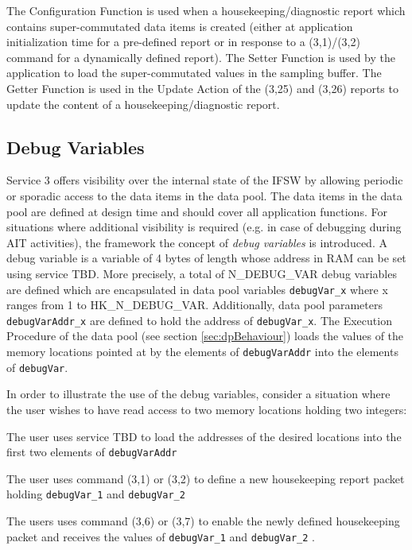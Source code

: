\documentclass{pnp_article}
\begin{document}
The Configuration Function is used when a housekeeping/diagnostic report which contains super-commutated data items is created (either at application initialization time for a pre-defined report or in response to a (3,1)/(3,2) command for a dynamically defined report). The Setter Function is used by the application to load the super-commutated values in the sampling buffer. The Getter Function is used in the Update Action of the (3,25) and (3,26) reports to update the content of a housekeeping/diagnostic report. 

\subsection{Debug Variables}\label{sec:debugVar}
Service 3 offers visibility over the internal state of the IFSW by allowing periodic or sporadic access to the data items in the data pool. The data items in the data pool are defined at design time and should cover all application functions. For situations where additional visibility is required (e.g. in case of debugging during AIT activities), the framework the concept of \textit{debug variables} is introduced. A debug variable is a variable of 4 bytes of length whose address in RAM can be set using service TBD. More precisely, a total of N\_DEBUG\_VAR debug variables are defined which are encapsulated in data pool variables \texttt{debugVar\_x} where x ranges from 1 to HK\_N\_DEBUG\_VAR. Additionally, data pool parameters \texttt{debugVarAddr\_x} are defined to hold the address of \texttt{debugVar\_x}. The Execution Procedure of the data pool (see section \ref{sec:dpBehaviour}) loads the values of the memory locations pointed at by the elements of \texttt{debugVarAddr} into the elements of \texttt{debugVar}.  

In order to illustrate the use of the debug variables, consider a situation where the user wishes to have read access to two memory locations holding two integers: 

\begin{fw_enumerate}
\item The user uses service TBD to load the addresses of the desired locations into the first two elements of \texttt{debugVarAddr}
\item The user uses command (3,1) or (3,2) to define a new housekeeping report packet holding \texttt{debugVar\_1} and \texttt{debugVar\_2} 
\item The users uses command (3,6) or (3,7) to enable the newly defined housekeeping packet and receives the values of \texttt{debugVar\_1} and \texttt{debugVar\_2} .
\end{fw_enumerate}
\end{document}
